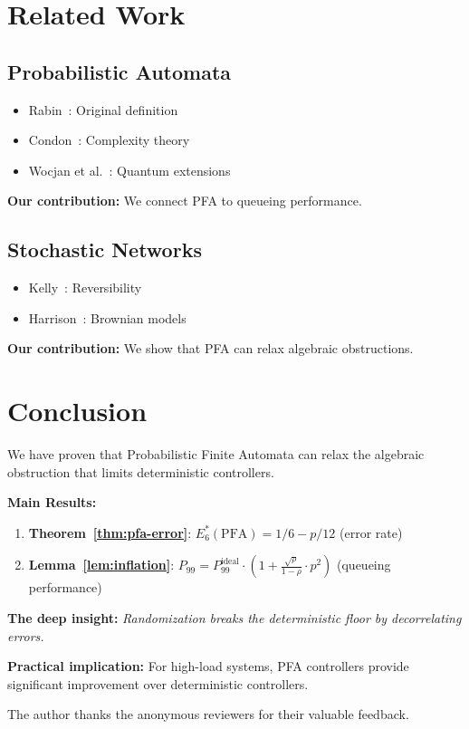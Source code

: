 \documentclass[11pt]{article}
\begin{document}
\section{Related Work}

\subsection{Probabilistic Automata}

\begin{itemize}
    \item Rabin~\cite{rabin1963probabilistic}: Original definition
    \item Condon~\cite{condon1993complexity}: Complexity theory
    \item Wocjan et al.~\cite{wocjan2006quantum}: Quantum extensions
\end{itemize}

\textbf{Our contribution:} We connect PFA to queueing performance.

\subsection{Stochastic Networks}

\begin{itemize}
    \item Kelly~\cite{kelly1996notes}: Reversibility
    \item Harrison~\cite{harrison2013stochastic}: Brownian models
\end{itemize}

\textbf{Our contribution:} We show that PFA can relax algebraic obstructions.

\section{Conclusion}

We have proven that Probabilistic Finite Automata can relax the algebraic obstruction that limits deterministic controllers.

\textbf{Main Results:}
\begin{enumerate}
    \item \textbf{Theorem~\ref{thm:pfa-error}}: $E_6^*(\text{PFA}) = 1/6 - p/12$ (error rate)
    \item \textbf{Lemma~\ref{lem:inflation}}: $P_{99} = P_{99}^{\text{ideal}} \cdot (1 + \frac{\sqrt{\rho}}{1-\rho} \cdot p^2)$ (queueing performance)
\end{enumerate}

\textbf{The deep insight:} \textit{Randomization breaks the deterministic floor by decorrelating errors.}

\textbf{Practical implication:} For high-load systems, PFA controllers provide significant improvement over deterministic controllers.

\begin{acks}
The author thanks the anonymous reviewers for their valuable feedback.
\end{acks}



\end{document}
